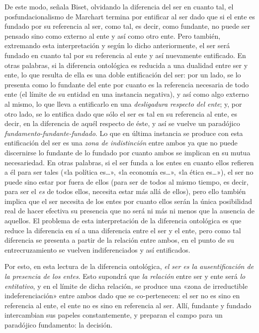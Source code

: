 De este modo, señala Biset, olvidando la diferencia del ser en cuanto tal, el posfundacionalismo de Marchart termina por entificar al ser dado que si el ente es fundado por su referencia al ser, como tal, es decir, como fundante, no puede ser pensado sino como externo al ente y así como otro ente. Pero también, extremando esta interpretación y según lo dicho anteriormente, el ser será fundado en cuanto tal por su referencia al ente y así nuevamente entificado. En otras palabras, si la diferencia ontológica es reducida a una dualidad entre ser y ente, lo que resulta de ella es una doble entificación del ser: por un lado, se lo presenta como lo fundante del ente por cuanto es la referencia necesaria de todo ente (el límite de su entidad en una instancia negativa), y así como algo externo al mismo, lo que lleva a entificarlo en una \emph{desligadura respecto del ente}; y, por otro lado, se lo entifica dado que sólo el ser es tal en su referencia al ente, es decir, en la diferencia de aquél respecto de éste, y así se vuelve un paradójico \emph{fundamento-fundante-fundado}. Lo que en última instancia se produce con esta entificación del ser es una \emph{zona de indistinción} entre ambos ya que no puede discernirse lo fundante de lo fundado por cuanto ambos se implican en su mutua necesariedad. En otras palabras, si el ser funda a los entes en cuanto ellos refieren a él para ser tales («la política es\ldots», «la economía es\ldots», «la ética es\ldots»), el ser no puede sino estar por fuera de ellos (para ser de todos al mismo tiempo, es decir, para ser el \emph{es} de todos ellos, necesita estar más allá de ellos), pero ello también implica que el ser necesita de los entes por cuanto ellos serán la única posibilidad real de hacer efectiva su presencia que no será ni más ni menos que la ausencia de aquellos. El problema de esta interpretación de la diferencia ontológica es que reduce la diferencia en sí a una diferencia entre el ser y el ente, pero como tal diferencia se presenta a partir de la relación entre ambos, en el punto de su entrecruzamiento se vuelven indiferenciados y así entificados.

Por esto, en esta lectura de la diferencia ontológica, \emph{el ser es la ausentificación de la presencia de los entes}. Esto supondrá que \emph{la relación} entre ser y ente será \emph{lo entitativo}, y en el límite de dicha relación, se produce una «zona de irreductible indeferenciación» entre ambos dado que se co-pertenecen: el ser no es sino en referencia al ente, el ente no es sino en referencia al ser. Allí, fundante y fundado intercambian sus papeles constantemente, y preparan el campo para un paradójico fundamento: la decisión.

